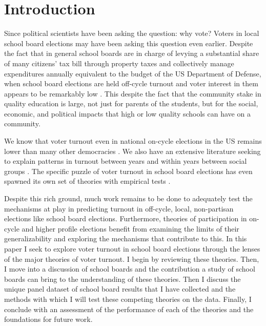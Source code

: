 \section{Introduction}
Since \citet{Downs57} political scientists have been asking the question: why vote? 
Voters in local school board elections may have been asking this question even 
earlier. Despite the fact that in general school boards are in charge of levying 
a substantial share of many citizens' tax bill through property taxes and 
collectively manage expenditures annually equivalent to the budget of the US 
Department of Defense, when school board elections are held off-cycle turnout 
and voter interest in them appears to be remarkably low \citep{RefWorks:333; RefWorks:321}. 
This despite the fact that the community stake in quality education is large, not 
just for parents of the students, but for the social, economic, and political 
impacts that high or low quality schools can have on a community. %

We know that voter turnout even in national on-cycle elections in the US remains 
lower than many other democracies \citep{BlaisTurnout2006}. We also have an extensive 
literature seeking to explain patterns in turnout between years and within years 
between social groups \citep{ParticAnnReview2004, econvoting2007, Galston2001, EconandOutcomes2000}.
The specific puzzle of voter turnout in school board elections has even spawned 
its own set of theories with empirical tests \citep{RefWorks:311,RefWorks:243,RefWorks:340}.

Despite this rich ground, much work remains to be done to adequately test the 
mechanisms at play in predicting turnout in off-cycle, local, non-partisan elections 
like school board elections. Furthermore, theories of participation in on-cycle and 
higher profile elections benefit from examining the limits of their generalizability and 
exploring the mechanisms that contribute to this. In this paper I seek to explore 
voter turnout in school board elections through the lenses of the major theories of 
voter turnout. I begin by reviewing these theories. Then, I move into a discussion 
of school boards and the contribution a study of school boards can bring to 
the understanding of these theories. Then I discuss the unique panel dataset of 
school board results that I have collected and the methods with which I will test 
these competing theories on the data. Finally, I conclude with an assessment of 
the performance of each of the theories and the foundations for future work. 



